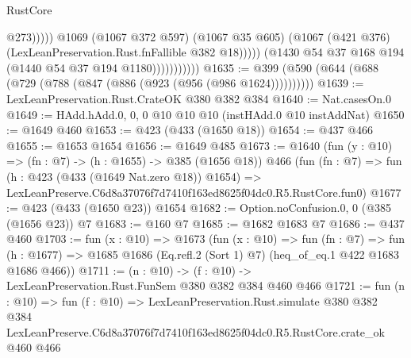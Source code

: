 \begin{lexlean}{RustCore}
\begin{coremodule}
                                      @273)))))
                            @1069
                            (@1067 @372 @597)
                            (@1067 @35 @605)
                            (@1067 (@421 @376) (LexLeanPreservation.Rust.fnFallible @382 @18)))))
                      (@1430 @54 @37 @168 @194 (@1440 @54 @37 @194 @1180)))))))))))
@1635 := @399 (@590 (@644 (@688 (@729 (@788 (@847 (@886 (@923 (@956 (@986 @1624))))))))))
@1639 := LexLeanPreservation.Rust.CrateOK @380 @382 @384
@1640 := Nat.casesOn.{0}
@1649 := HAdd.hAdd.{0, 0, 0} @10 @10 @10 (instHAdd.{0} @10 instAddNat)
@1650 := @1649 @460
@1653 := @423 (@433 (@1650 @18))
@1654 := @437 @466
@1655 := @1653 @1654
@1656 := @1649 @485
@1673 := @1640
    (fun (y : @10) => (fn : @7) -> (h : @1655) -> @385 (@1656 @18))
    @466
    (fun (fn : @7) =>
    fun (h : @423 (@433 (@1649 Nat.zero @18)) @1654) =>
    LexLeanPreserve.C6d8a37076f7d7410f163ed8625f04dc0.R5.RustCore.fun0)
@1677 := @423 (@433 (@1650 @23)) @1654
@1682 := Option.noConfusion.{0, 0} (@385 (@1656 @23)) @7
@1683 := @160 @7
@1685 := @1682 @1683 @7
@1686 := @437 @460
@1703 := fun (x : @10) =>
  @1673
    (fun (x : @10) =>
    fun (fn : @7) =>
    fun (h : @1677) => @1685 @1686 (Eq.refl.{2} (Sort 1) @7) (heq_of_eq.{1} @422 @1683 @1686 @466))
@1711 := (n : @10) -> (f : @10) -> LexLeanPreservation.Rust.FunSem @380 @382 @384 @460 @466
@1721 := fun (n : @10) =>
  fun (f : @10) =>
  LexLeanPreservation.Rust.simulate
    @380
    @382
    @384
    LexLeanPreserve.C6d8a37076f7d7410f163ed8625f04dc0.R5.RustCore.crate_ok
    @460
    @466
\end{coremodule}
\end{lexlean}
